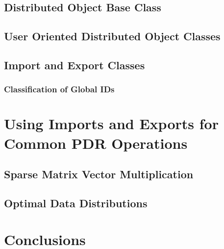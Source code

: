 \documentclass[10pt,relax]{PetraObjectModel}
\begin{document}
\subsection{Distributed Object Base Class}

\subsection{User Oriented Distributed Object Classes}

\subsection{Import and Export Classes}

\subsubsection{Classification of Global IDs}


\section{Using Imports and Exports for Common PDR Operations}

\subsection{Sparse Matrix Vector Multiplication}

\subsection{Optimal Data Distributions}

\section{Conclusions}


%
\clearpage


\end{document}
